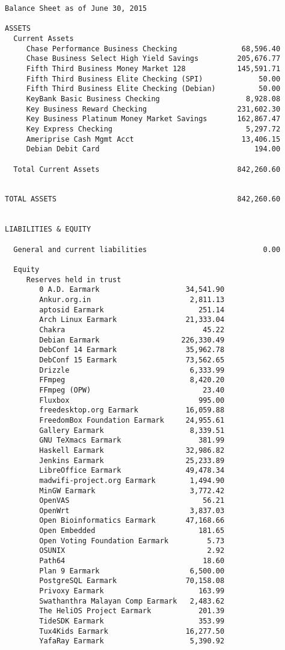 \documentclass[letterpaper]{report}
\begin{document}
\begin{verbatim}
Balance Sheet as of June 30, 2015

ASSETS
  Current Assets
     Chase Performance Business Checking               68,596.40
     Chase Business Select High Yield Savings         205,676.77
     Fifth Third Business Money Market 128            145,591.71
     Fifth Third Business Elite Checking (SPI)             50.00
     Fifth Third Business Elite Checking (Debian)          50.00
     KeyBank Basic Business Checking                    8,928.08
     Key Business Reward Checking                     231,602.30
     Key Business Platinum Money Market Savings       162,867.47
     Key Express Checking                               5,297.72
     Ameriprise Cash Mgmt Acct                         13,406.15
     Debian Debit Card                                    194.00

  Total Current Assets                                842,260.60


TOTAL ASSETS                                          842,260.60


LIABILITIES & EQUITY

  General and current liabilities                           0.00

  Equity
     Reserves held in trust
        0 A.D. Earmark                    34,541.90
        Ankur.org.in                       2,811.13
        aptosid Earmark                      251.14
        Arch Linux Earmark                21,333.04
        Chakra                                45.22
        Debian Earmark                   226,330.49
        DebConf 14 Earmark                35,962.78
        DebConf 15 Earmark                73,562.65
        Drizzle                            6,333.99
        FFmpeg                             8,420.20
        FFmpeg (OPW)                          23.40
        Fluxbox                              995.00
        freedesktop.org Earmark           16,059.88
        FreedomBox Foundation Earmark     24,955.61
        Gallery Earmark                    8,339.51
        GNU TeXmacs Earmark                  381.99
        Haskell Earmark                   32,986.82
        Jenkins Earmark                   25,233.89
        LibreOffice Earmark               49,478.34
        madwifi-project.org Earmark        1,494.90
        MinGW Earmark                      3,772.42
        OpenVAS                               56.21
        OpenWrt                            3,837.03
        Open Bioinformatics Earmark       47,168.66
        Open Embedded                        181.65
        Open Voting Foundation Earmark         5.73
        OSUNIX                                 2.92
        Path64                                18.60
        Plan 9 Earmark                     6,500.00
        PostgreSQL Earmark                70,158.08
        Privoxy Earmark                      163.99
        Swathanthra Malayan Comp Earmark   2,483.62
        The HeliOS Project Earmark           201.39
        TideSDK Earmark                      353.99
        Tux4Kids Earmark                  16,277.50
        YafaRay Earmark                    5,390.92


\end{verbatim}
\end{document}
